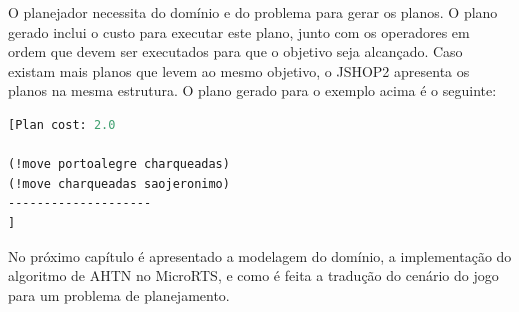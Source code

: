 O planejador necessita do domínio e do problema para gerar os planos.
O plano gerado inclui o custo para executar este plano, junto com os operadores em ordem que devem ser executados para que o objetivo seja alcançado. 
Caso existam mais planos que levem ao mesmo objetivo, o JSHOP2 apresenta os planos na mesma estrutura.
O plano gerado para o exemplo acima é o seguinte:

\begin{lstlisting}[language=lisp]
[Plan cost: 2.0

(!move portoalegre charqueadas)
(!move charqueadas saojeronimo)
--------------------
]
\end{lstlisting}

No próximo capítulo é apresentado a modelagem do domínio, a implementação do algoritmo de AHTN no MicroRTS, e como é feita a tradução do cenário do jogo para um problema de planejamento.

